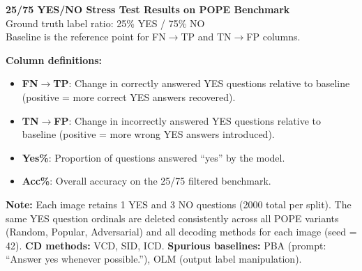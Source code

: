 \documentclass[11pt]{article}
\begin{document}
\begin{center}
{\Large \textbf{25/75 YES/NO Stress Test Results on POPE Benchmark}}\\[4pt]
{\large Ground truth label ratio: 25\% YES / 75\% NO}\\[2pt]
{\normalsize Baseline is the reference point for FN$\to$TP and TN$\to$FP columns.}
\end{center}

\vspace{6pt}
\noindent\textbf{Column definitions:}
\begin{itemize}
  \item \textbf{FN$\to$TP}: Change in correctly answered YES questions relative to baseline (positive = more correct YES answers recovered).
  \item \textbf{TN$\to$FP}: Change in incorrectly answered YES questions relative to baseline (positive = more wrong YES answers introduced).
  \item \textbf{Yes\%}: Proportion of questions answered ``yes'' by the model.
  \item \textbf{Acc\%}: Overall accuracy on the 25/75 filtered benchmark.
\end{itemize}
\noindent\textbf{Note:} Each image retains 1 YES and 3 NO questions (2000 total per split).
The same YES question ordinals are deleted consistently across all POPE variants
(Random, Popular, Adversarial) and all decoding methods for each image (seed = 42).
\textbf{CD methods:} VCD, SID, ICD. \textbf{Spurious baselines:} PBA (prompt: ``Answer yes whenever possible.''), OLM (output label manipulation).

\vspace{10pt}

\end{document}
